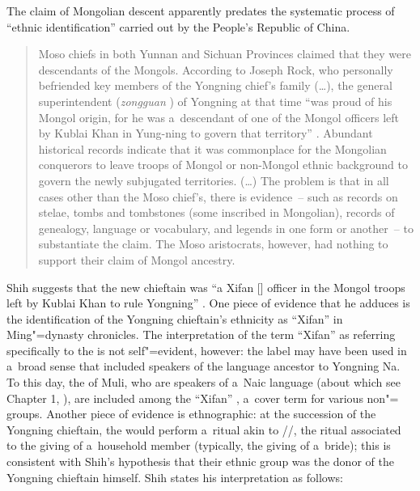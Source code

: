 {\noindent}The claim of Mongolian descent apparently predates the systematic process of “ethnic identification” carried out by the People's Republic of China. 

\begin{quotation}
	Moso chiefs in both Yunnan and Sichuan Provinces claimed that they were descendants of the Mongols. According to Joseph Rock, who personally befriended key members of the Yongning chief's family ({\dots}), the general superintendent (\textit{zongguan} ) of Yongning at that time “was proud of his Mongol origin, for he was a~descendant of one of the Mongol officers left by Kublai Khan in Yung-ning to govern that territory” \citep[359]{rock1947}. Abundant historical records indicate that it was commonplace for the Mongolian conquerors to leave troops of Mongol or non-Mongol ethnic background to govern the newly subjugated territories. ({\dots}) The problem is that in all cases other than the Moso chief's, there is evidence~-- such as records on stelae, tombs and tombstones (some inscribed in Mongolian), records of genealogy, language or vocabulary, and legends in one form or another~-- to substantiate the claim. The Moso aristocrats, however, had nothing to support their claim of Mongol ancestry. \citep[40-41]{shih2010}
\end{quotation}

{\noindent}Shih suggests that the new chieftain was “a Xifan [] officer in the Mongol troops left by Kublai Khan to
rule Yongning” \citep[51]{shih2010}. One piece of evidence that he adduces is the identification of the Yongning chieftain's ethnicity as “Xifan”  in Ming"=dynasty chronicles. The interpretation of the term “Xifan” as referring specifically to the  is not self"=evident, however: the label may have been used in a~broad sense that included speakers of the language ancestor to Yongning Na. To this day, the  of Muli, who are speakers of a~{Naic} language (about which see Chapter 1, ), are included among the “Xifan” , a~cover term for various non"= groups. Another piece of evidence is ethnographic: at the succession of the Yongning chieftain, the  would perform a~ritual akin to //, the ritual associated to the giving of a~household member (typically, the giving of a~bride); this is consistent with Shih's hypothesis that their ethnic group was the donor of the Yongning chieftain himself. Shih states his interpretation as follows:

